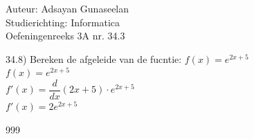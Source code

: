 \documentclass[a4paper]{article}
\begin{document}
\noindent \large Auteur: Adsayan Gunaseelan \\
\noindent \large Studierichting: Informatica\\
\noindent \large Oefeningenreeks 3A nr. 34.3\\

\medskip

\normalsize
34.8) Bereken de afgeleide van de fucntie: $f(x) = e^{2x+5}$ \\

$f(x) = e^{2x+5}$\\

$f'(x) = \dfrac{d}{dx}(2x+5) \cdot e^{2x+5}$\\

$f'(x)= 2e^{2x+5}$\\



\begin{thebibliography}{999}
\end{thebibliography}
\end{document}
